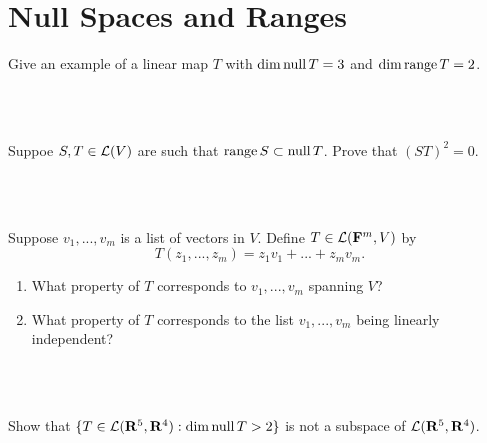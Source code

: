 \section{Null Spaces and Ranges}

\begin{exercise}
    Give an example of a linear map $T$ with $\dim \operatorname{\text{null}} T = 3$ and $\dim \operatorname{\text{range}} T = 2$. \\
\end{exercise}

\begin{solution}
    \\ \td \\
\end{solution}

\begin{exercise}
    Suppoe $S,T \in \mathcal{L}(V)$ are such that $\operatorname{\text{range}} S \subset \operatorname{\text{null}} T$. Prove that $(ST)^2 = 0$. \\
\end{exercise}

\begin{solution}
    \\ \td \\
\end{solution}

\begin{exercise}
    Suppose $v_1, ..., v_m$ is a list of vectors in $V$. Define $T \in \mathcal{L}(\mathbf{F}^m, V)$ by
    $$T(z_1, ..., z_m) = z_1v_1 + ... + z_mv_m.$$
    \begin{enumerate}[label=(\alph*)]
        \item What property of $T$ corresponds to $v_1, ..., v_m$ spanning $V$?
        \item What property of $T$ corresponds to the list $v_1, ..., v_m$ being linearly independent?
    \end{enumerate}
\end{exercise}

\begin{solution}
    \\ \td \\
\end{solution}

\begin{exercise}
    Show that $\{T \in \mathcal{L}(\mathbf{R}^5, \mathbf{R}^4) : \dim \operatorname{\text{null}} T > 2\}$ is not a subspace of $\mathcal{L}(\mathbf{R}^5, \mathbf{R}^4)$. \\
\end{exercise}

\begin{solution}
    \\ \td \\
\end{solution}